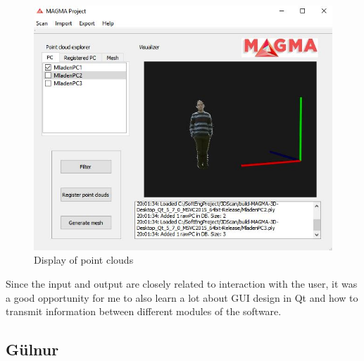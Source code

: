 \documentclass[aps,letterpaper,11pt]{revtex4}
\begin{document}
\begin{figure}[h]
\includegraphics[scale=0.5]{PC_display}
\caption{Display of point clouds}
\label{fig:PCdisp}
\end{figure}

Since the input and output are closely related to interaction with the user, it was a good opportunity for me to also learn a lot about GUI design in Qt and how to transmit information between different modules of the software.\par

\subsection{Gülnur}
\end{document}
